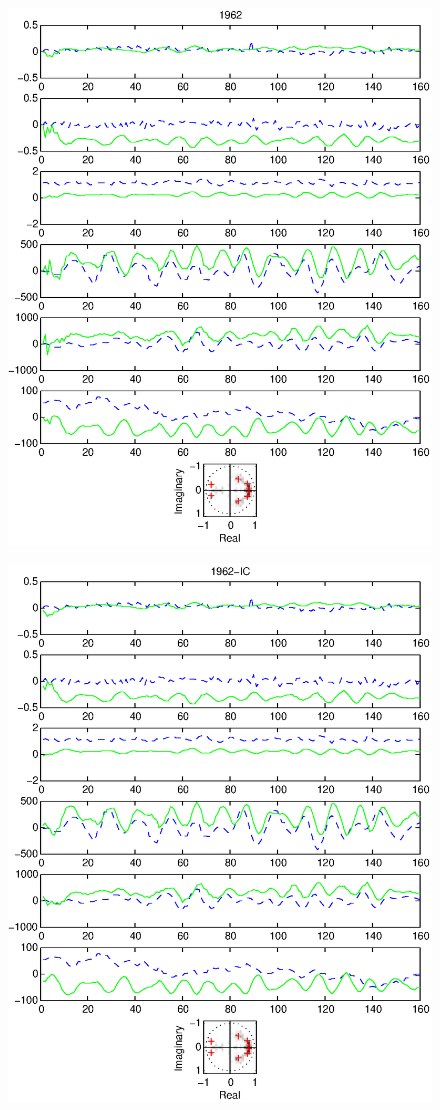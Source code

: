 \documentclass{article}
\begin{document}
\begin{figure}[htb!]\centering
\includegraphics{1962.eps}
\end{figure}\clearpage
\begin{figure}[htb!]\centering
\includegraphics{1962_ic.eps}
\end{figure}\clearpage
\end{document}
